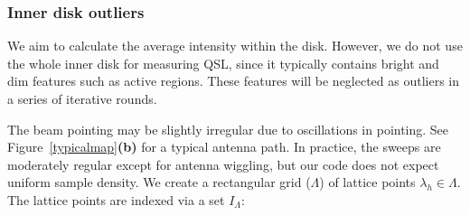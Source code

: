 \documentclass{aa}
\begin{document}
  \subsubsection{Inner disk outliers} \label{sect:disk_outliers}

  We aim to calculate the average intensity within the disk. However, we do not use the whole inner disk for measuring 
  QSL, since it typically contains bright and dim features such as active regions. These features will be neglected as 
  outliers in a series of iterative rounds.

  The beam pointing may be slightly 
  irregular due to oscillations in pointing. See Figure~\ref{typicalmap}{\bf(b)} for a typical antenna path. In 
  practice, the sweeps are moderately regular except for antenna wiggling, but our code does not expect uniform sample 
  density. We create a rectangular grid ($\Lambda$) of lattice points $\lambda_h \in \Lambda$. The lattice points are indexed via a set $I_{\Lambda}$:
  
\end{document}
